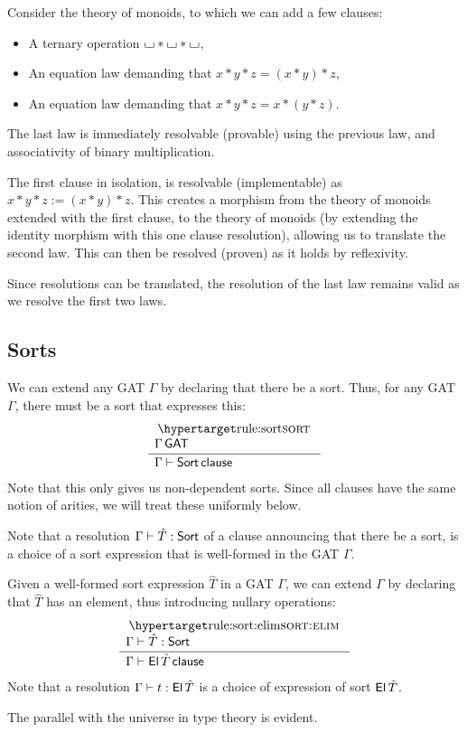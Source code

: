 \documentclass[a4paper]{article}
\begin{document}
\begin{example}
	Consider the theory of monoids, to which we can add a few clauses:
	\begin{itemize}
		\item A ternary operation ${\llcorner\hspace{-.4ex}\lrcorner} * {\llcorner\hspace{-.4ex}\lrcorner} * {\llcorner\hspace{-.4ex}\lrcorner}$,
		\item An equation law demanding that $x * y * z = (x * y) * z$,
		\item An equation law demanding that $x * y * z = x * (y * z)$.
	\end{itemize}
	The last law is immediately resolvable (provable) using the previous law, and associativity of binary multiplication.
	
	The first clause in isolation, is resolvable (implementable) as $x * y * z := (x * y) * z$.
	This creates a morphism from the theory of monoids extended with the first clause, to the theory of monoids (by extending the identity morphism with this one clause resolution), allowing us to translate the second law.
	This can then be resolved (proven) as it holds by reflexivity.
	
	Since resolutions can be translated, the resolution of the last law remains valid as we resolve the first two laws.
\end{example}

\subsection{Sorts}
We can extend any GAT $\Gamma$ by declaring that there be a sort.
Thus, for any GAT $\Gamma$, there must be a sort that expresses this:
\[
	\inferencel{sort}{
		\Gamma \GAT
	}{
		\Gamma \sez \Sort \clause
	}{}
\]
Note that this only gives us non-dependent sorts.
Since all clauses have the same notion of arities, we will treat these uniformly below.

Note that a resolution $\Gamma \vdash \hat T : {\mathsf{Sort}}$ of a clause announcing that there be a sort, is a choice of a sort expression that is well-formed in the GAT $\Gamma$.

Given a well-formed sort expression $\hat T$ in a GAT $\Gamma$, we can extend $\Gamma$ by declaring that $\hat T$ has an element, thus introducing nullary operations:
\[
	\inferencel{sort:elim}{
		\Gamma \sez \hat T : \Sort
	}{
		\Gamma \sez \El\,\hat T \clause
	}{}
\]
Note that a resolution $\Gamma \vdash t : {\mathsf{El}}\,\hat T$ is a choice of expression of sort ${\mathsf{El}}\,\hat T$.

The parallel with the universe in type theory is evident.
\end{document}
